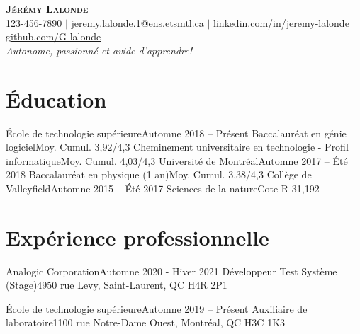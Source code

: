\documentclass[letterpaper,11pt]{article}
\begin{document}
\begin{center}
  \textbf{\Huge \scshape Jérémy Lalonde} \\ \vspace{1pt}
  \small 123-456-7890 $|$ \href{mailto:jeremy.lalonde.1@ens.etsmtl.ca}{jeremy.lalonde.1@ens.etsmtl.ca} $|$ 
  \href{https://linkedin.com/in/jeremy-lalonde}{linkedin.com/in/jeremy-lalonde} $|$
  \href{https://github.com/G-lalonde}{github.com/G-lalonde} \\
  \textit{\small {Autonome, passionné et avide d'apprendre!}}
\end{center}

\section{Éducation}
  \resumeSubHeadingListStart
    \resumeSubheadingTwo 
      {École de technologie supérieure}{Automne 2018 -- Présent}
      {Baccalauréat en génie logiciel}{Moy. Cumul. 3,92/4,3}
      {Cheminement universitaire en technologie - Profil informatique}{Moy. Cumul. 4,03/4,3}
    \resumeSubheading
      {Université de Montréal}{Automne 2017 -- Été 2018}
      {Baccalauréat en physique (1 an)}{Moy. Cumul. 3,38/4,3}
    \resumeSubheading
      {Collège de Valleyfield}{Automne 2015 -- Été 2017}
      {Sciences de la nature}{Cote R 31,192}
  \resumeSubHeadingListEnd

\section{Expérience professionnelle}
  \resumeSubHeadingListStart

    \resumeSubheading
      {Analogic Corporation}{Automne 2020 - Hiver 2021}
      {Développeur Test Système (Stage)}{4950 rue Levy, Saint-Laurent, QC H4R 2P1}
      \resumeItemListStart
      \resumeItemListEnd

    \resumeSubheading
      {École de technologie supérieure}{Automne 2019 -- Présent}
      {Auxiliaire de laboratoire}{1100 rue Notre-Dame Ouest, Montréal, QC H3C 1K3}
      \resumeItemListStart
      \resumeItemListEnd
    
\end{document}
